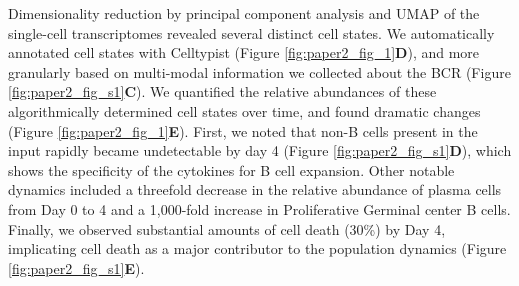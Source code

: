 Dimensionality reduction by principal component analysis and UMAP\cite{mcinnes_umap_2018} of the single-cell transcriptomes revealed several distinct cell states. We automatically annotated cell states with Celltypist (Figure \ref{fig:paper2_fig_1}\textbf{D})\cite{dominguez_conde_cross-tissue_2022}, and more granularly based on multi-modal information we collected about the BCR (Figure \ref{fig:paper2_fig_s1}\textbf{C}). We quantified the relative abundances of these algorithmically determined cell states over time, and found dramatic changes (Figure \ref{fig:paper2_fig_1}\textbf{E}). First, we noted that non-B cells present in the input rapidly became undetectable by day 4 (Figure \ref{fig:paper2_fig_s1}\textbf{D}), which shows the specificity of the cytokines for B cell expansion. Other notable dynamics included a threefold decrease in the relative abundance of plasma cells from Day 0 to 4 and a 1,000-fold increase in Proliferative Germinal center B cells. Finally, we observed substantial amounts of cell death (30\%) by Day 4, implicating cell death as a major contributor to the population dynamics (Figure \ref{fig:paper2_fig_s1}\textbf{E}).
